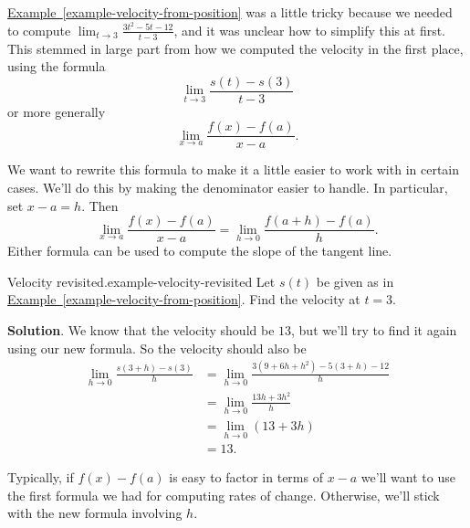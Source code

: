 \documentclass[10pt,]{book}
\numberwithin{equation}{section}
\begin{document}
\hypertarget{p-86}{}%
\hyperref[example-velocity-from-position]{Example~\ref{example-velocity-from-position}} was a little tricky because we needed to compute \(\lim_{t\to3}\frac{3t^{2}-5t-12}{t-3}\), and it was unclear how to simplify this at first. This stemmed in large part from how we computed the velocity in the first place, using the formula%
\begin{equation*}
\lim_{t\to3}\frac{s(t)-s(3)}{t-3}
\end{equation*}
or more generally%
\begin{equation*}
\lim_{x\to a}\frac{f(x) - f(a)}{x-a}\text{.}
\end{equation*}
%
\par
\hypertarget{p-87}{}%
We want to rewrite this formula to make it a little easier to work with in certain cases. We'll do this by making the denominator easier to handle. In particular, set \(x-a = h\). Then%
\begin{equation*}
\lim_{x\to a}\frac{f(x) - f(a)}{x-a} = \lim_{h\to0}\frac{f(a+h)-f(a)}{h}.
\end{equation*}
Either formula can be used to compute the slope of the tangent line.%
\begin{example}{Velocity revisited.}{example-velocity-revisited}%
\hypertarget{p-88}{}%
Let \(s(t)\) be given as in \hyperref[example-velocity-from-position]{Example~\ref{example-velocity-from-position}}. Find the velocity at \(t=3\).%
\par\smallskip%
\noindent\textbf{Solution}.\hypertarget{solution-19}{}\quad%
\hypertarget{p-89}{}%
We know that the velocity should be \(13\), but we'll try to find it again using our new formula. So the velocity should also be%
%
\begin{align*}
\lim_{h\to0}\frac{s(3+h)-s(3)}{h} & = \lim_{h\to0}\frac{3(9+6h+h^{2})-5(3+h)-12}{h} \\
& = \lim_{h\to0}\frac{13h+3h^{2}}{h} \\
& = \lim_{h\to0}(13+3h) \\
& = 13. 
\end{align*}
\end{example}
\hypertarget{p-90}{}%
Typically, if \(f(x)-f(a)\) is easy to factor in terms of \(x-a\) we'll want to use the first formula we had for computing rates of change. Otherwise, we'll stick with the new formula involving \(h\).%
%
%
\typeout{************************************************}
\typeout{************************************************}
%
\end{document}
